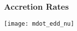 \documentclass[]{beamer}
\begin{document}
\begin{frame}
  \frametitle{Accretion Rates}
  \begin{center}
    \texttt{[image: mdot\_edd\_nu]}
  \end{center}
\end{frame}

% 
% 
% 
% 
%           
% 
\end{document}
